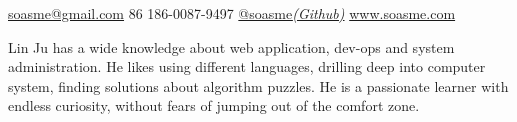 \documentclass[10pt,a4paper]{article} %
\begin{document}


\noindent\href{mailto:soasme@gmail.com}{soasme@gmail.com}\bull
\textsmaller{+}86 186-0087-9497\bull 
\href{https://github.com/soasme}{@soasme\textit{(Github)}}\bull
\href{http://www.soasme.com}{www.soasme.com}\\ %
\spacedhrule{0.9em}{-0.4em} %



\vspace{-1.3em} %

\begin{multicols}{2}  %
  Lin Ju has a wide knowledge about web application, dev-ops and system administration. He likes using different languages, drilling deep into computer system, finding solutions about algorithm puzzles. He is a passionate learner with endless curiosity, without fears of jumping out of the comfort zone.
\end{multicols}

\spacedhrule{0.5em}{-0.4em} %


\end{document}

